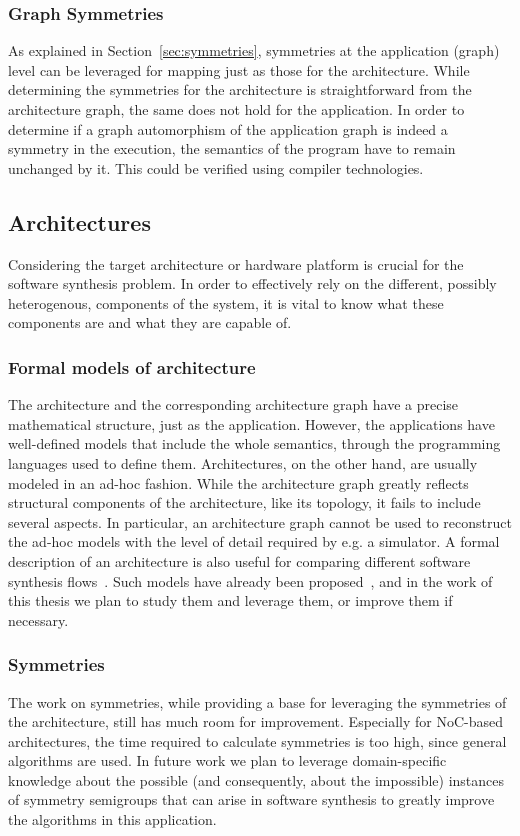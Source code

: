 \documentclass[sigplan,10pt]{acmart}
\begin{document}
\subsubsection{Graph Symmetries}
As explained in Section~\ref{sec:symmetries}, symmetries at the application (graph) level can be leveraged for mapping just as those for the architecture.
While determining the symmetries for the architecture is straightforward from the architecture graph, the same does not hold for the application.
In order to determine if a graph automorphism of the application graph is indeed a symmetry in the execution, the semantics of the program have to remain unchanged by it. 
This could be verified using compiler technologies.

\subsection{Architectures}
Considering the target architecture or hardware platform is crucial for the software synthesis problem.
In order to effectively rely on the different, possibly heterogenous, components of the system, it is vital to know what these components are and what they are capable of.


\subsubsection{Formal models of architecture}
The architecture and the corresponding architecture graph have a precise mathematical structure, just as the application. However, the applications have well-defined models that include the whole semantics, through the programming languages used to define them.
Architectures, on the other hand, are usually modeled in an ad-hoc fashion. While the architecture graph greatly reflects structural components of the architecture, like its topology, it fails to include several aspects.
In particular, an architecture graph cannot be used to reconstruct the ad-hoc models with the level of detail required by e.g. a simulator.
A formal description of an architecture is also useful for comparing different software synthesis flows~\cite{goens_mcsoc16}.
Such models have already been proposed~\cite{moa}, and in the work of this thesis we plan to study them and leverage them, or improve them if necessary.

\subsubsection{Symmetries}
The work on symmetries, while providing a base for leveraging the symmetries of the architecture, still has much room for improvement. Especially for NoC-based architectures, the time required to calculate symmetries is too high, since general algorithms are used.
In future work we plan to leverage domain-specific knowledge about the possible (and consequently, about the impossible) instances of symmetry semigroups that can arise in software synthesis to greatly improve the algorithms in this application.
\end{document}
